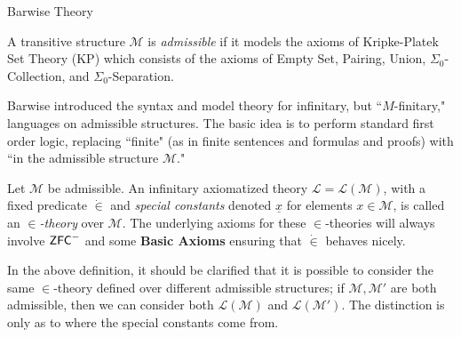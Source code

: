 \documentclass[utf8x,xcolor=svgnames,8pt]{beamer}
\newcommand{\M}{\mathcal{M}}
\newcommand{\ZFC}{\textup{\ensuremath{\textsf{ZFC}}}}
\begin{document}
\begin{frame}{Barwise Theory}
\begin{definition} A transitive structure $\M$ is \emph{admissible} if it models the axioms of \textsf{Kripke-Platek Set Theory} (\textsf{KP}) which consists of the axioms of \textsf{Empty Set}, \textsf{Pairing}, \textsf{Union}, $\Sigma_0$-\textsf{Collection}, and $\Sigma_0$-\textsf{Separation}. \end{definition}

Barwise introduced the syntax and model theory for infinitary, but ``$M$-finitary," languages on admissible structures. The basic idea is to perform standard first order logic, replacing ``finite" (as in finite sentences and formulas and proofs) with ``in the admissible structure $\mathcal M$."
%
\begin{definition}[$\in$-theory] Let $\M$ be admissible. An infinitary axiomatized theory $\mathcal L=\mathcal L(\M)$, with a fixed predicate $\dot \in$ and \emph{special constants} denoted $\underline x$ for elements $x \in \M$, is called an \textit{$\in$-theory} over $\M$. The underlying axioms for these $\in$-theories will always involve $\ZFC^-$ and some \textbf{Basic Axioms} ensuring that $\dot \in$ behaves nicely. \end{definition}

In the above definition, it should be clarified that it is possible to consider the same $\in$-theory defined over different admissible structures; if $\M, \M'$ are both admissible, then we can consider both $\mathcal L(\M)$ and $\mathcal L(\M')$. The distinction is only as to where the special constants come from. 

\end{frame}
\end{document}
